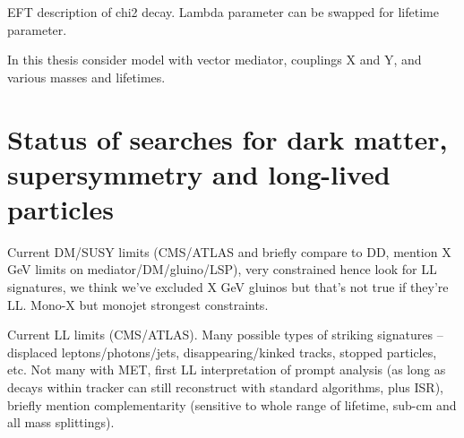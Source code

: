 EFT description of chi2 decay. Lambda parameter can be swapped for lifetime 
parameter.

In this thesis consider model with vector mediator, couplings X and Y, and 
various masses and lifetimes.

\begin{comment}
Define compressed and uncompressed? Mention ISR/FSR? (Adam)
\end{comment}


\section{Status of searches for dark matter, supersymmetry and long-lived 
particles}

Current DM/SUSY limits (CMS/ATLAS and briefly compare to DD, mention X GeV 
limits on 
mediator/DM/gluino/LSP), very constrained hence look for LL signatures, we 
think we’ve excluded X GeV gluinos but that’s not true if they’re LL.
Mono-X but monojet strongest constraints.

Current LL limits (CMS/ATLAS).
Many possible types of striking signatures -- displaced leptons/photons/jets, 
disappearing/kinked tracks, stopped particles, etc.
Not many with MET, first LL interpretation of 
prompt analysis (as long as decays within tracker can still reconstruct with 
standard algorithms, plus ISR), briefly mention complementarity (sensitive to 
whole range of lifetime, sub-cm and all mass splittings).


